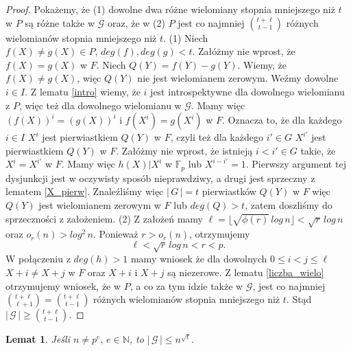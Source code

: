 \documentclass[declaration,shortabstract]{iithesis}
\theoremstyle{definition}
\theoremstyle{remark} \newtheorem{observation}{Obserwacja}
\theoremstyle{plain} \newtheorem{theorem}{Twierdzenie}
\theoremstyle{plain} \newtheorem{lemma}{Lemat}
\theoremstyle{remark} \newtheorem*{remark*}{Uwaga}
\theoremstyle{reminder} \newtheorem*{reminder*}{Przypomnienie}
\begin{document}
\begin{proof}
	Pokażemy, że (1) dowolne dwa różne wielomiany stopnia mniejszego niż $t$ w $P$ są różne także w $\mathcal{G}$ oraz, że w (2) $P$ jest co najmniej  ${t + \ell \choose t - 1}$ różnych wielomianów stopnia mniejszego niż $t$. 
	\newline
	(1) Niech $f(X) \neq g(X) \in P, \, deg(f), deg(g) < t$. Załóżmy nie wprost, że $f(X) = g(X)$ w $F$. 
	Niech $Q(Y) = f(Y) - g(Y)$. Wiemy, że $f(X) \neq g(X)$, więc $Q(Y)$ nie jest wielomianem zerowym. Weźmy dowolne $i \in I$. Z lematu \ref{intro} wiemy, że $i$ jest introspektywne dla dowolnego wielomianu z $P$, więc też dla dowolnego wielomianu w $\mathcal{G}$. Mamy więc $(f(X))^i = (g(X))^i$ i $f(X^i) = g(X^i)$ w $F$. Oznacza to, że dla każdego $i \in I$ $X^i$ jest pierwiastkiem $Q(Y)$ w $F$, czyli też dla każdego $i' \in G$ $X^{i'}$ jest pierwiastkiem $Q(Y)$ w $F$. Załóżmy nie wprost, że istnieją $i < i' \in G$ takie, że $X^i = X^{i'}$ w $F$. Mamy więc $h(X) | X^i$ w $\mathbb{F}_p$ lub $X^{i - i'} = 1$. Pierwszy argument tej dysjunkcji jest w oczywisty sposób nieprawdziwy, a drugi jest sprzeczny z lematem \ref{X_pierw}.
	Znaleźliśmy więc $|\,G\,| = t$ pierwiastków $Q(Y)$ w $F$ więc $Q(Y)$ jest wielomianem zerowym w $F$ lub $deg(Q) > t$, zatem doszliśmy do sprzeczności z założeniem.\newline
	(2) Z założeń mamy $\ell = \lfloor \sqrt{\phi(r)} \, log\, n \rfloor < \sqrt{r} \, log \, n $ oraz $o_r(n) > log^2 \, n$. Ponieważ $r > o_r(n)$, otrzymujemy \[\ell < \sqrt{r} \, log \, n < r < p.\] W połączeniu z $deg(h) > 1$ mamy wniosek że dla dowolnych $0 \leq i < j \leq \ell$ $X + i \neq X + j$ w $F$ oraz $X + i$ i $X + j$ są niezerowe. 
	\newline Z lematu \ref{liczba_wielo} otrzymujemy wniosek, że w $P$, a co za tym idzie także w $\mathcal{G}$, jest co najmniej ${t + \ell \choose \ell + 1} = {t + \ell \choose t - 1}$ różnych wielomianów stopnia mniejszego niż $t$. Stąd $| \, \mathcal{G} \, | \geq {t + \ell \choose t - 1}$.
\end{proof}
	
\begin{lemma} \label{upper}
	Jeśli $n \neq p^e, \, e \in \mathbb{N}$, to $| \, \mathcal{G} \, | \leq n^{\sqrt{t}}$.
\end{lemma}
	
\end{document}
